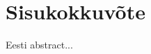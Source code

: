 
\chapter{Sisukokkuv\~{o}te} %

Eesti abstract...





\ifpdf
    \graphicspath{{7/figures/PNG/}{7/figures/PDF/}{7/figures/}}
\else
    \graphicspath{{7/figures/EPS/}{7/figures/}}
\fi








